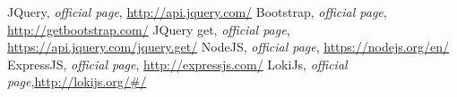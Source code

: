 \begin{thebibliography}{99999}
\singlespace\normalsize

 JQuery, \textit{ official page}, \url{http://api.jquery.com/}
 Bootstrap, \textit{ official page}, \url{http://getbootstrap.com/}
 JQuery get, \textit{ official page}, \url{https://api.jquery.com/jquery.get/}
 NodeJS, \textit{ official page}, \url{https://nodejs.org/en/}
 ExpressJS, \textit{ official page}, \url{http://expressjs.com/}
 LokiJs, \textit{ official page},\url{http://lokijs.org/#/}




\end{thebibliography}
